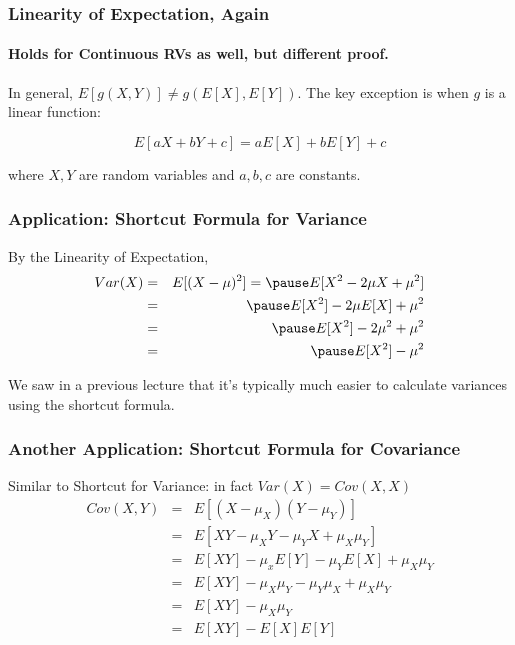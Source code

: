 \documentclass[handout]{beamer}
\begin{document}

\begin{frame}
\frametitle{Linearity of Expectation, Again}
\framesubtitle{Holds for Continuous RVs as well, but different proof.}
In general, $E[g(X,Y)]\neq g(E[X],E[Y])$. The key exception is when $g$ is a linear function:

\Large
$$\boxed{E[aX + bY + c] = aE[X] + bE[Y] + c}$$

\vspace{0.2in}
\normalsize
where $X,Y$ are random variables and $a,b,c$ are constants.
\end{frame}

\begin{frame}
\frametitle{Application: Shortcut Formula for Variance}

By the Linearity of Expectation, 
\begin{eqnarray*}
	Var(X) &=&  E[(X - \mu)^2] = \pause E[X^2 - 2\mu X + \mu^2]\\
		&=& \pause E[X^2] - 2\mu E[X] + \mu^2\\
		&=& \pause E[X^2] - 2\mu^2 + \mu^2\\
		&=& \pause E[X^2] - \mu^2
\end{eqnarray*}

\alert{We saw in a previous lecture that it's typically much easier to calculate variances using the shortcut formula.}

\end{frame}


\begin{frame}
\frametitle{Another Application: Shortcut Formula for Covariance}
\alert{Similar to Shortcut for Variance: in fact $Var(X) = Cov(X,X)$}
\begin{eqnarray*}
	Cov(X,Y)&=& E[(X - \mu_X)(Y-\mu_Y)]\\
			&=& E[XY - \mu_X Y - \mu_Y X + \mu_X \mu_Y]\\
			&=&E[XY] - \mu_xE[Y] - \mu_Y E[X] + \mu_X \mu_Y\\
			&=& E[XY] - \mu_X\mu_Y - \mu_Y\mu_X + \mu_X \mu_Y\\
			&=& E[XY] - \mu_X \mu_Y\\
			&=& E[XY] - E[X]E[Y]
\end{eqnarray*}

\end{frame}
\end{document}
